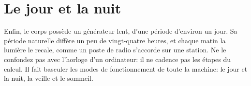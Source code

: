 \section*{Le jour et la nuit}

Enfin, le corps possède un générateur lent, d'une période d'environ un jour. Sa période naturelle diffère un peu de vingt-quatre heures, et chaque matin la lumière le recale, comme un poste de radio s'accorde sur une station. Ne le confondez pas avec l'horloge d'un ordinateur: il ne cadence pas les étapes du calcul. Il fait basculer les modes de fonctionnement de toute la machine: le jour et la nuit, la veille et le sommeil.

